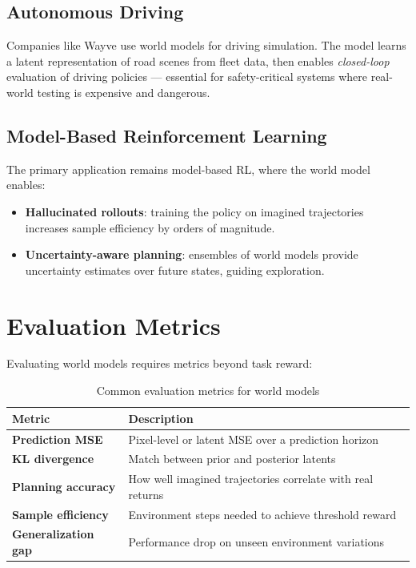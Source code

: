 \documentclass{tufte-handout}
\begin{document}
\subsection{Autonomous Driving}
Companies like Wayve use world models for driving simulation. The model learns a latent
representation of road scenes from fleet data, then enables \textit{closed-loop} evaluation of
driving policies --- essential for safety-critical systems where real-world testing is expensive
and dangerous.

\subsection{Model-Based Reinforcement Learning}
The primary application remains model-based RL, where the world model enables:

\begin{itemize}
    \item \textbf{Hallucinated rollouts}: training the policy on imagined trajectories increases
          sample efficiency by orders of magnitude.
    \item \textbf{Uncertainty-aware planning}: ensembles of world models provide uncertainty
          estimates over future states, guiding exploration.
\end{itemize}

\section{Evaluation Metrics}

Evaluating world models requires metrics beyond task reward:

\begin{table}[h]
\centering
\begin{tabularx}{\textwidth}{lX}
\toprule
Metric & Description \\
\midrule
\textbf{Prediction MSE} & Pixel-level or latent MSE over a prediction horizon \\
\textbf{KL divergence} & Match between prior and posterior latents \\
\textbf{Planning accuracy} & How well imagined trajectories correlate with real returns \\
\textbf{Sample efficiency} & Environment steps needed to achieve threshold reward \\
\textbf{Generalization gap} & Performance drop on unseen environment variations \\
\bottomrule
\end{tabularx}
\caption{Common evaluation metrics for world models}
\label{tab:metrics}
\end{table}
\end{document}
